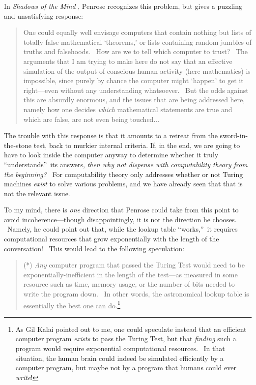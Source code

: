 \documentclass[11pt,onecolumn]{article}%
\begin{document}
In \textit{Shadows of the Mind} \cite[p. 83]{penrose:shadows}, Penrose
recognizes this problem, but gives a puzzling and unsatisfying response:

\begin{quotation}
\noindent One could equally well envisage computers that contain nothing but
lists of totally false mathematical `theorems,' or lists containing random
jumbles of truths and falsehoods. \ How are we to tell which computer to
trust? \ The arguments that I am trying to make here do not say that an
effective simulation of the output of conscious human activity (here
mathematics) is impossible, since purely by chance the computer might `happen'
to get it right---even without any understanding whatsoever. \ But the odds
against this are absurdly enormous, and the issues that are being addressed
here, namely how one decides \textit{which} mathematical statements are true
and which are false, are not even being touched...
\end{quotation}

The trouble with this response is that it amounts to a retreat from the
sword-in-the-stone test, back to murkier internal criteria. If, in the end, we
are going to have to look inside the computer anyway to determine whether it
truly \textquotedblleft understands\textquotedblright\ its answers,
\textit{then why not dispense with computability theory from the beginning?}
\ For computability theory only addresses whether or not Turing machines
\textit{exist} to solve various problems, and we have already seen that that
is not the relevant issue.

To my mind, there is \textit{one} direction that Penrose could take from this
point to avoid incoherence---though disappointingly, it is not the direction
he chooses. \ Namely, he could point out that, while the lookup table
\textquotedblleft works,\textquotedblright\ it requires computational
resources that grow exponentially\textit{ }with the length of the
conversation! \ This would lead to the following speculation:

\begin{quotation}
\noindent(*) \textit{Any} computer program that passed the Turing Test would
need to be exponentially-inefficient in the length of the test---as measured
in some resource such as time, memory usage, or the number of bits needed to
write the program down. \ In other words, the astronomical lookup table is
essentially the best one can do.\footnote{As Gil Kalai pointed out to me, one
could speculate instead that an efficient computer program \textit{exists} to
pass the Turing Test, but that \textit{finding} such a program would require
exponential computational resources. \ In that situation, the human brain
could indeed be simulated efficiently by a computer program, but maybe not by
a program that humans could ever \textit{write}!}
\end{quotation}
\end{document}

